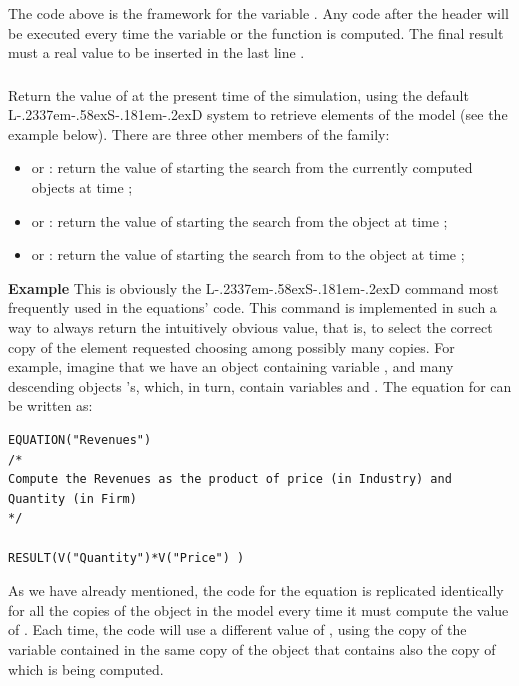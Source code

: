\documentclass [11pt,a4paper] {book}
\def\LsD{{L\kern-.2337em\lower-.58ex\hbox{S}\kern-.181em\lower-.2ex\hbox{D}}\xspace}
\begin{document}
The code above is the framework for the variable . Any code after the header  will be executed every time the variable or the function is computed. The final result must a real value to be inserted in the last line .


\subsubsection{ }\label{fun:val}
Return the value of  at the present time of the simulation, using the default \LsD system to retrieve elements of the model (see the example below). There are three other members of the family:
\begin{itemize}
  \item {} or : return the value of  starting the search from the currently computed objects at time ;
  \item  {} or : return the value of  starting the search from the object  at time ;
  \item {} or : return the value of  starting the search from to the object  at time ;
\end{itemize}

\textbf{Example }This is obviously the \LsD command most frequently used in the equations' code. This command is
implemented in such a way to always return the intuitively obvious value, that is, to select the correct copy of the element requested choosing among possibly many copies. For example, imagine that we have an object  containing variable , and many descending objects 's, which, in turn, contain variables
 and . The equation for  can be written as:

\small
\begin{verbatim}
EQUATION("Revenues")
/*
Compute the Revenues as the product of price (in Industry) and
Quantity (in Firm)
*/

RESULT(V("Quantity")*V("Price") )
\end{verbatim}
\normalsize

As we have already mentioned, the code for the equation is replicated identically for all
the copies of the object  in the model every time it must compute the value of
. Each time, the code will use a different value of , using
the copy of the variable contained in the same copy of the object that contains also the
copy of  which is being computed.
\end{document}
